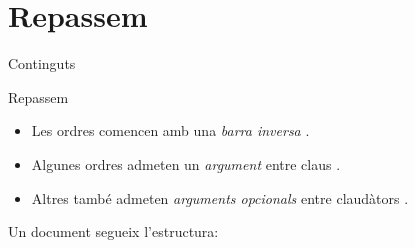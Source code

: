 
\date{10 de maig de 2024}

\subtitle{Segona part}



\begin{frame}
\titlepage
\end{frame}

\section{Repassem}
\begin{frame}{Continguts}
\begin{multicols}{2}
\tableofcontents[currentsection]
\end{multicols}
\end{frame}

\begin{frame}[fragile]{Repassem}
\begin{itemize}
\item Les ordres comencen amb una \emph{barra inversa} \keystrokebftt{\bs}.
\item Algunes ordres admeten un \emph{argument} entre claus \keystrokebftt{\{}
\keystrokebftt{\}}.
\item Altres també admeten \emph{arguments opcionals} entre claudàtors \keystrokebftt{[} \keystrokebftt{]}.
\end{itemize}
Un document segueix l'estructura:
\end{frame}


